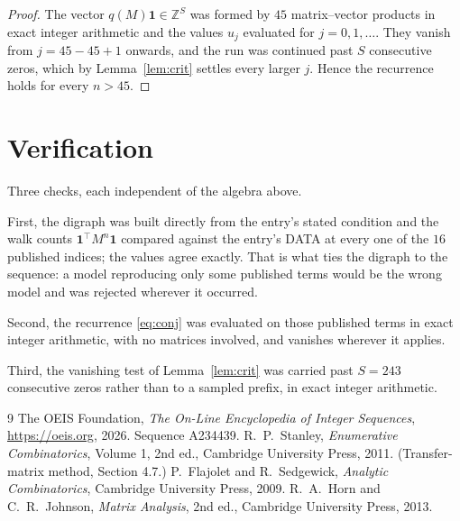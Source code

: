 \documentclass[11pt,a4paper]{article}
\theoremstyle{plain}
\theoremstyle{definition}
\begin{document}
\begin{proof}
The vector $q(M)\mathbf{1}\in\mathbb{Z}^{S}$ was formed by $45$ matrix--vector
products in exact integer arithmetic and the values $u_j$ evaluated for
$j=0,1,\dots$. They vanish from $j=45-45+1$ onwards, and the run was continued past
$S$ consecutive zeros, which by Lemma~\ref{lem:crit} settles every larger $j$. Hence the
recurrence holds for every $n>45$.
\end{proof}

\section{Verification}

Three checks, each independent of the algebra above.

First, the digraph was built directly from the entry's stated condition and the walk counts
$\mathbf{1}^{\!\top}M^{n}\mathbf{1}$ compared against the entry's DATA at every one of
the $16$ published indices; the values agree exactly. That is what ties the digraph to
the sequence: a model reproducing only some published terms would be the wrong model and
was rejected wherever it occurred.

Second, the recurrence \eqref{eq:conj} was evaluated on those published terms in exact
integer arithmetic, with no matrices involved, and vanishes wherever it applies.

Third, the vanishing test of Lemma~\ref{lem:crit} was carried past $S=243$ consecutive
zeros rather than to a sampled prefix, in exact integer arithmetic.

\begin{thebibliography}{9}
 The OEIS Foundation, \emph{The On-Line Encyclopedia of Integer
Sequences}, \url{https://oeis.org}, 2026. Sequence A234439.
 R.~P.~Stanley, \emph{Enumerative Combinatorics}, Volume 1, 2nd ed.,
Cambridge University Press, 2011. (Transfer-matrix method, Section 4.7.)
 P.~Flajolet and R.~Sedgewick, \emph{Analytic Combinatorics}, Cambridge
University Press, 2009.
 R.~A.~Horn and C.~R.~Johnson, \emph{Matrix Analysis}, 2nd ed., Cambridge
University Press, 2013.
\end{thebibliography}
\end{document}
